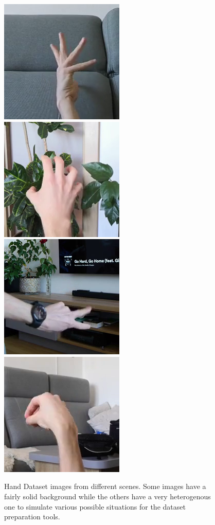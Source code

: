 \begin{figure}[!ht]
{    }
    \vspace{0.1cm}
    \centerline{
        \includegraphics[scale=0.46]{figures/dataset_hand/scene007_cam2_image00028.png}
        \includegraphics[scale=0.46]{figures/dataset_hand/scene008_cam1_image00024.png}
        \includegraphics[scale=0.46]{figures/dataset_hand/scene009_cam0_image00010.png}
        \includegraphics[scale=0.46]{figures/dataset_hand/scene010_cam1_image00019.png}
    }
    \caption{Hand Dataset images from different scenes. Some images have a fairly solid background while the others have a very heterogenous one to simulate various possible situations for the dataset preparation tools.}
    \label{fig:dataset-hand-simple-example}
\end{figure}

